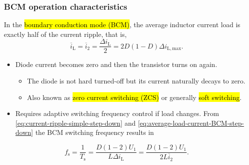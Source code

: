 \begin{frame}
    \frametitle{BCM operation characteristics}
    In the \hl{boundary conduction mode (BCM)}, the average inductor current load is exactly half of the current ripple, that is, 
    \begin{equation}
        \overline{i}_\mathrm{L}=\overline{i}_2=\frac{\Delta i_\mathrm{L}}{2}= 2D(1-D)\Delta i_\mathrm{L,max}.
        \label{eq:average-load-current-BCM-step-down}
    \end{equation}
    \vspace{-0.5cm}
    \begin{itemize}
        \item Diode current becomes zero and then the transistor turns on again.
        \begin{itemize}
            \item The diode is not hard turned-off but its current naturally decays to zero.
            \item Also known as \hl{zero current switching (ZCS)} or generally \hl{soft switching}.
        \end{itemize}
        \item Requires adaptive switching frequency control if load changes. From \eqref{eq:current-ripple-simple-step-down} and \eqref{eq:average-load-current-BCM-step-down} the BCM switching frequency results in 
    \end{itemize}
    \begin{equation}
        f_\mathrm{s} = \frac{1}{T_\mathrm{s}} = \frac{D(1-2)U_1}{L\Delta i_\mathrm{L} } = \frac{D(1-2)U_1}{2L \overline{i}_2 }.
    \end{equation}
\end{frame}

